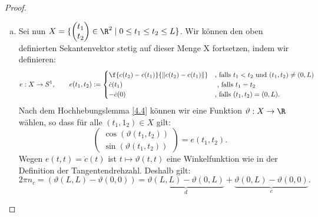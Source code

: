 \documentclass{mycourse}
\newcommand{\tta}{\vartheta}
\begin{document}
\begin{st}[Umlaufsatz]
\begin{proof}
\begin{enumerate}[a)]
	\item
		Sei nun $X = \{ \begin{pmatrix} t_1 \\ t_2 \end{pmatrix} \in \R^2 \; | \; 0 \leq t_1 \leq t_2 \leq L \}$. Wir können den oben definierten Sekantenvektor stetig auf dieser Menge X fortsetzen, indem wir definieren: 
\[
e : X \to S^1 , \qquad e(t_1, t_2 ) := \begin{cases} 
					\displaystyle \f{c(t_2) - c(t_1)}{\| c(t_2) - c(t_1) \|} & \text{, falls } t_1 < t_2 \text{ und } (t_1, t_2) \neq (0, L) \\
					\displaystyle \dot c(t_1) & \text{ , falls } t_1 = t_2 \\
					\displaystyle - \dot c(0)  & \text{, falls } (t_1, t_2) = (0, L). 
\end{cases}
\]
Nach dem Hochhebungslemma \ref{4.4} können wir eine Funktion $\tta: X \to \R$ wählen, so dass für alle $(t_1, 1_2) \in X$ gilt: 
\[ \begin{pmatrix} \cos(\tta(t_1, t_2)) \\ \sin(\tta(t_1, t_2)) \end{pmatrix} = e(t_1, t_2). \]
Wegen $e(t,t) = \dot c(t) $ ist $t \mapsto \tta(t, t)$ eine Winkelfunktion wie in der Definition der Tangentendrehzahl. Deshalb gilt: 
\[ 2 \pi n_c = (\tta(L,L) - \tta(0, 0)) = \underbrace{\tta(L, L) - \tta(0, L)}_d + \underbrace{\tta(0, L) - \tta(0, 0)}_c .\]


\end{enumerate}
\end{proof}
\end{st}
\end{document}
